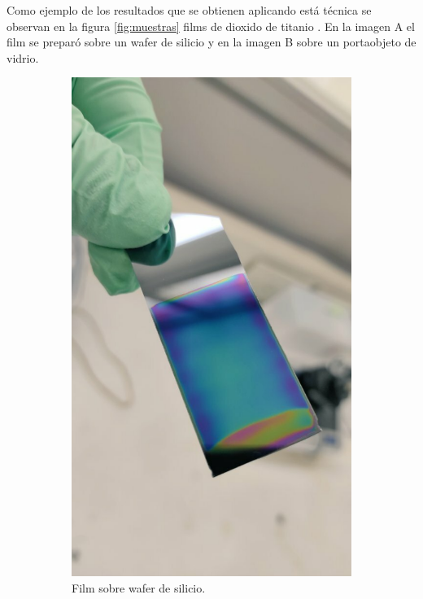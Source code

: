 Como ejemplo de los resultados que se obtienen aplicando está técnica se observan en la figura \ref{fig:muestras} films de dioxido de titanio . En la imagen A el film se preparó sobre un wafer de silicio y en la imagen B sobre un portaobjeto de vidrio.


\begin{figure}[!htpb]
     \centering
     \begin{subfigure}[b]{0.4\textwidth}
         \centering
         \includegraphics[width=.7\textwidth]{./Figures/muestra_1.pdf}
         \caption{Film sobre wafer de silicio.}
         \label{fig:muestra_1}
     \end{subfigure}
     \hfill
     \begin{subfigure}[b]{0.4\textwidth}
         \centering

\end{subfigure}
\end{figure}
